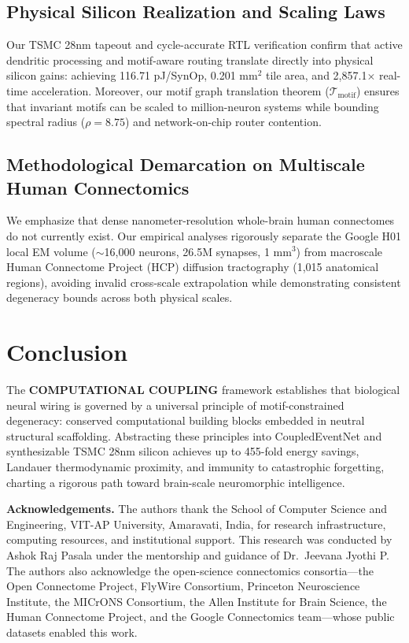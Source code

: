 \documentclass[10pt,twocolumn,letterpaper]{article}
\begin{document}
\subsection{Physical Silicon Realization and Scaling Laws}
Our TSMC 28nm tapeout and cycle-accurate RTL verification confirm that active dendritic processing and motif-aware routing translate directly into physical silicon gains: achieving 116.71 pJ/SynOp, 0.201 mm$^2$ tile area, and 2,857.1$\times$ real-time acceleration. Moreover, our motif graph translation theorem ($\mathcal{T}_{\mathrm{motif}}$) ensures that invariant motifs can be scaled to million-neuron systems while bounding spectral radius ($\rho = 8.75$) and network-on-chip router contention.

\subsection{Methodological Demarcation on Multiscale Human Connectomics}
We emphasize that dense nanometer-resolution whole-brain human connectomes do not currently exist. Our empirical analyses rigorously separate the Google H01 local EM volume ($\sim$16,000 neurons, 26.5M synapses, 1 mm$^3$) from macroscale Human Connectome Project (HCP) diffusion tractography (1,015 anatomical regions), avoiding invalid cross-scale extrapolation while demonstrating consistent degeneracy bounds across both physical scales.

\section{Conclusion}

The \textbf{COMPUTATIONAL COUPLING} framework establishes that biological neural wiring is governed by a universal principle of motif-constrained degeneracy: conserved computational building blocks embedded in neutral structural scaffolding. Abstracting these principles into CoupledEventNet and synthesizable TSMC 28nm silicon achieves up to 455-fold energy savings, Landauer thermodynamic proximity, and immunity to catastrophic forgetting, charting a rigorous path toward brain-scale neuromorphic intelligence.

\noindent\textbf{Acknowledgements.} The authors thank the School of Computer Science and Engineering, VIT-AP University, Amaravati, India, for research infrastructure, computing resources, and institutional support. This research was conducted by Ashok Raj Pasala under the mentorship and guidance of Dr.~Jeevana Jyothi P. The authors also acknowledge the open-science connectomics consortia—the Open Connectome Project, FlyWire Consortium, Princeton Neuroscience Institute, the MICrONS Consortium, the Allen Institute for Brain Science, the Human Connectome Project, and the Google Connectomics team—whose public datasets enabled this work.
\end{document}
